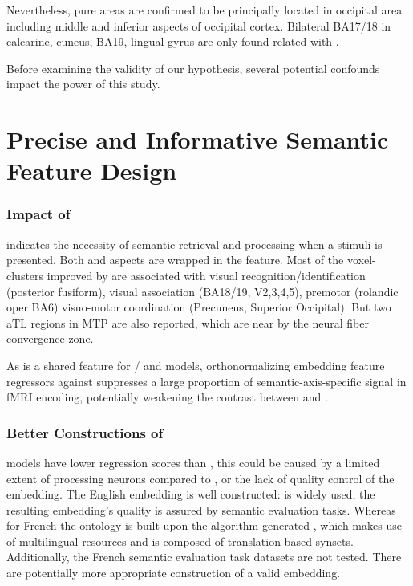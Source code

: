 Nevertheless, pure \association areas are confirmed to be principally located in occipital area including middle and inferior aspects of occipital cortex. Bilateral BA17/18 in calcarine, cuneus, BA19, lingual gyrus are only found related with .

Before examining the validity of our hypothesis, several potential confounds impact the power of this study.

\section{Precise and Informative Semantic Feature Design}

\subsubsection{Impact of }

 indicates the necessity of semantic retrieval and processing when a stimuli is presented. Both \similarity and \association aspects are wrapped in the feature. Most of the voxel-clusters improved by  are associated with visual recognition\slash identification (posterior fusiform), visual association (BA18/19, V2,3,4,5), premotor (rolandic oper BA6) visuo-motor coordination (Precuneus, Superior Occipital). But two aTL regions in MTP are also reported, which are near by the neural fiber convergence zone. 

As  is a shared feature for \slash{} and  models, orthonormalizing embedding feature regressors against  suppresses a large proportion of semantic-axis-specific signal in fMRI encoding, potentially weakening the contrast between  and .

\subsubsection{Better Constructions of }

 models have lower regression scores than , this could be caused by a limited extent of \similarity processing neurons compared to \association, or the lack of quality control of the  embedding. The English  embedding is well constructed:  is widely used, the resulting embedding's quality is assured by semantic evaluation tasks. Whereas for French the ontology is built upon the algorithm-generated , which makes use of multilingual resources and is composed of translation-based synsets. Additionally, the French semantic evaluation task datasets are not tested. There are potentially more appropriate construction of a valid \similarity embedding.

